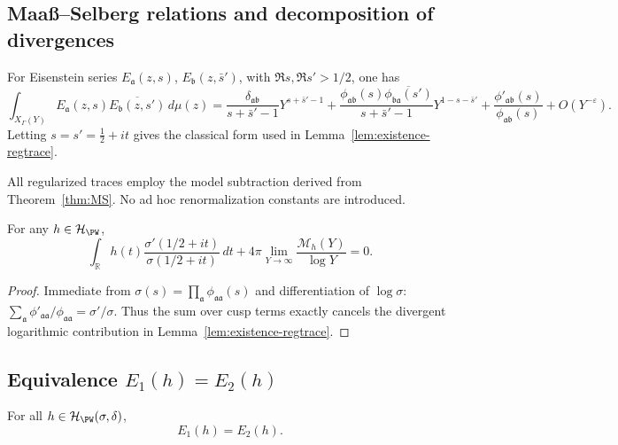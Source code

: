 \subsection{Maaß–Selberg relations and decomposition of divergences}
\label{subsec:ch4-part3-MS-relations} \relax

\begin{theorem}
\label{thm:MS}
For Eisenstein series $E_{\mathfrak a}(z,s)$, $E_{\mathfrak b}(z,\bar s')$, with $\Re s,\Re s'>1/2$, one has
\[
\int_{X_\Gamma(Y)} E_{\mathfrak a}(z,s)\overline{E_{\mathfrak b}(z,s')}\,d\mu(z)
=\frac{\delta_{\mathfrak a\mathfrak b}}{s+\bar s'-1}Y^{s+\bar s'-1}
+\frac{\phi_{\mathfrak a\mathfrak b}(s)\overline{\phi_{\mathfrak b\mathfrak a}(s')}}{s+\bar s'-1}Y^{1-s-\bar s'}
+\frac{\phi'_{\mathfrak a\mathfrak b}(s)}{\phi_{\mathfrak a\mathfrak b}(s)}+O(Y^{-\varepsilon}).
\]
Letting $s=s'=\tfrac12+it$ gives the classical form used in Lemma~\ref{lem:existence-regtrace}. \relax
\end{theorem}

\begin{invariant}
All regularized traces employ the model subtraction derived from Theorem~\ref{thm:MS}. No ad hoc renormalization constants are introduced. \relax
\end{invariant}

\begin{lemma}
\label{lem:cancellation-div}
For any $h\in\mathcal{H}_{\PW}$,
\[
\int_{\mathbb{R}}h(t)\frac{\sigma'(1/2+it)}{\sigma(1/2+it)}\,dt
+4\pi \lim_{Y\to\infty}\frac{\mathcal{M}_h(Y)}{\log Y}=0.
\]
\end{lemma}

\begin{proof}\relax
Immediate from $\sigma(s)=\prod_{\mathfrak a}\phi_{\mathfrak a\mathfrak a}(s)$ and differentiation of $\log\sigma$:
\(\sum_{\mathfrak a}\phi'_{\mathfrak a\mathfrak a}/\phi_{\mathfrak a\mathfrak a}=\sigma'/\sigma.\)
Thus the sum over cusp terms exactly cancels the divergent logarithmic contribution in Lemma~\ref{lem:existence-regtrace}. \relax
\end{proof}

\subsection{Equivalence $E_1(h)=E_2(h)$}
\label{subsec:ch4-part3-equivalence-proof} \relax

\begin{theorem}
\label{thm:E1E2}
For all $h\in\mathcal{H}_{\PW}(\sigma,\delta)$,
\[
E_1(h)=E_2(h).
\]
\end{theorem}

